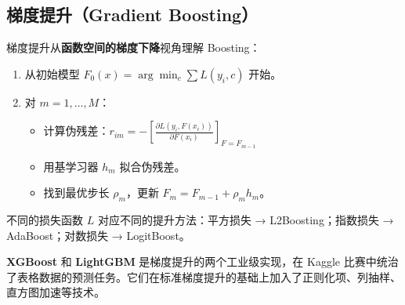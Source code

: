 \documentclass[
]{book}
\newenvironment{Shaded}{\begin{snugshade}}{\end{snugshade}}
\newcommand{\AttributeTok}[1]{\textcolor[rgb]{0.13,0.29,0.53}{#1}}
\newcommand{\CommentTok}[1]{\textcolor[rgb]{0.56,0.35,0.01}{\textit{#1}}}
\newcommand{\DecValTok}[1]{\textcolor[rgb]{0.00,0.00,0.81}{#1}}
\newcommand{\FloatTok}[1]{\textcolor[rgb]{0.00,0.00,0.81}{#1}}
\newcommand{\FunctionTok}[1]{\textcolor[rgb]{0.13,0.29,0.53}{\textbf{#1}}}
\newcommand{\NormalTok}[1]{#1}
\newcommand{\OtherTok}[1]{\textcolor[rgb]{0.56,0.35,0.01}{#1}}
\newcommand{\SpecialCharTok}[1]{\textcolor[rgb]{0.81,0.36,0.00}{\textbf{#1}}}
\newcommand{\StringTok}[1]{\textcolor[rgb]{0.31,0.60,0.02}{#1}}
\providecommand{\tightlist}{%
  \setlength{\itemsep}{0pt}\setlength{\parskip}{0pt}}
\begin{document}
\subsection{梯度提升（Gradient Boosting）}\label{ux68afux5ea6ux63d0ux5347gradient-boosting}

梯度提升从\textbf{函数空间的梯度下降}视角理解 Boosting：

\begin{enumerate}
\def\labelenumi{\arabic{enumi}.}
\tightlist
\item
  从初始模型 \(F_0(x) = \arg\min_c \sum L(y_i, c)\) 开始。
\item
  对 \(m = 1, \ldots, M\)：

  \begin{itemize}
  \tightlist
  \item
    计算伪残差：\(r_{im} = -\left[\frac{\partial L(y_i, F(x_i))}{\partial F(x_i)}\right]_{F = F_{m-1}}\)
  \item
    用基学习器 \(h_m\) 拟合伪残差。
  \item
    找到最优步长 \(\rho_m\)，更新 \(F_m = F_{m-1} + \rho_m h_m\)。
  \end{itemize}
\end{enumerate}

不同的损失函数 \(L\) 对应不同的提升方法：平方损失 → L2Boosting；指数损失 → AdaBoost；对数损失 → LogitBoost。

\textbf{XGBoost} 和 \textbf{LightGBM} 是梯度提升的两个工业级实现，在 Kaggle 比赛中统治了表格数据的预测任务。它们在标准梯度提升的基础上加入了正则化项、列抽样、直方图加速等技术。

\begin{Shaded}
\end{Shaded}
\end{document}
